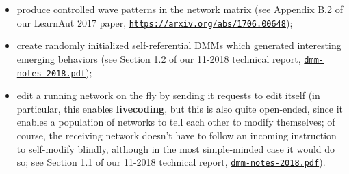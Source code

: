 \documentclass{article}
\begin{document}
  \begin{itemize}
     \item produce controlled wave patterns in the network matrix (see Appendix B.2 of our LearnAut 2017 paper, \href{https://arxiv.org/abs/1706.00648}{\tt https://arxiv.org/abs/1706.00648});
     \item create randomly initialized self-referential DMMs which generated interesting emerging behaviors (see Section 1.2 of our 11-2018 technical report, \href{https://www.cs.brandeis.edu/~bukatin/dmm-notes-2018.pdf}{\tt dmm-notes-2018.pdf});
     \item edit a running network on the fly by sending it requests to edit itself (in particular, this enables {\bf livecoding}, but this is also quite open-ended, since it enables a population of networks to tell each other to modify themselves; of course, the receiving network doesn't have to follow an incoming instruction to self-modify blindly, although in the most simple-minded case it would do so; see Section 1.1 of our 11-2018 technical report, \href{https://www.cs.brandeis.edu/~bukatin/dmm-notes-2018.pdf}{\tt dmm-notes-2018.pdf}).
  \end{itemize}
\end{document}
